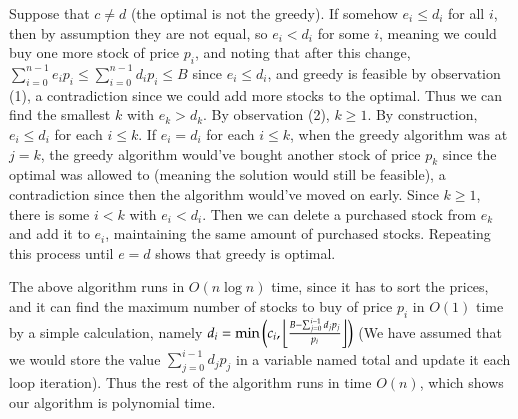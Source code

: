 \documentclass[12pt]{article}
\theoremstyle{definitionstyle}
\newcommand{\floor}[1]{\left\lfloor#1\right\rfloor}
\begin{document}
    Suppose that $c \neq d$ (the optimal is not the greedy). If somehow $e_i \leq d_i$ for all $i$, then by assumption they are not equal, so $e_i < d_i$ for some $i$, meaning we could buy one more stock of price $p_i$, and noting that after this change, $\sum_{i=0}^{n-1} e_ip_i \leq \sum_{i=0}^{n-1} d_ip_i \leq B$ since $e_i \leq d_i$, and greedy is feasible by observation (1), a contradiction since we could add more stocks to the optimal. Thus we can find the smallest $k$ with $e_k > d_k$. By observation (2), $k \geq 1$. By construction, $e_i \leq d_i$ for each $i \leq k$. If $e_i = d_i$ for each $i \leq k$, when the greedy algorithm was at $j=k$, the greedy algorithm would've bought another stock of price $p_k$ since the optimal was allowed to (meaning the solution would still be feasible), a contradiction since then the algorithm would've moved on early. Since $k \geq 1$, there is some $i < k$ with $e_i < d_i$. Then we can delete a purchased stock from $e_k$ and add it to $e_i$, maintaining the same amount of purchased stocks. Repeating this process until $e = d$ shows that greedy is optimal.

    The above algorithm runs in $O(n\log n)$ time, since it has to sort the prices, and it can find the maximum number of stocks to buy of price $p_i$ in $O(1)$ time by a simple calculation, namely $d_i = \min\qty(c_i, \floor{\frac{B - \sum_{j=0}^{i-1} d_jp_j}{p_i}})$ (We have assumed that we would store the value $\sum_{j=0}^{i-1} d_jp_j$ in a variable named total and update it each loop iteration). Thus the rest of the algorithm runs in time $O(n)$, which shows our algorithm is polynomial time.
\end{document}
